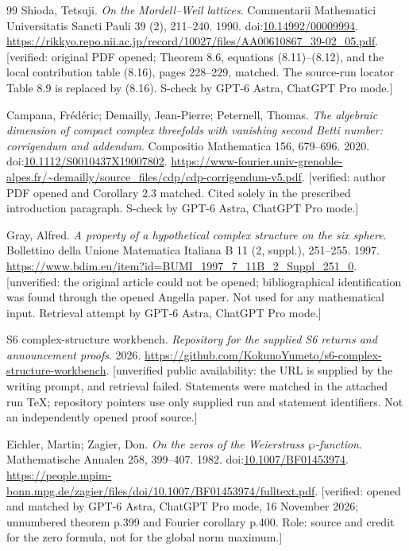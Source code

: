 \begin{thebibliography}{99}
Shioda, Tetsuji. \emph{On the Mordell--Weil lattices}. Commentarii Mathematici Universitatis Sancti Pauli 39 (2), 211--240. 1990. doi:\url{10.14992/00009994}. \url{https://rikkyo.repo.nii.ac.jp/record/10027/files/AA00610867_39-02_05.pdf}. [verified: original PDF opened; Theorem 8.6, equations (8.11)--(8.12), and the local contribution table (8.16), pages 228--229, matched. The source-run locator Table 8.9 is replaced by (8.16). S-check by GPT-6 Astra, ChatGPT Pro mode.]

Campana, Fr{\'e}d{\'e}ric; Demailly, Jean-Pierre; Peternell, Thomas. \emph{The algebraic dimension of compact complex threefolds with vanishing second Betti number: corrigendum and addendum}. Compositio Mathematica 156, 679--696. 2020. doi:\url{10.1112/S0010437X19007802}. \url{https://www-fourier.univ-grenoble-alpes.fr/~demailly/source_files/cdp/cdp-corrigendum-v5.pdf}. [verified: author PDF opened and Corollary 2.3 matched. Cited solely in the prescribed introduction paragraph. S-check by GPT-6 Astra, ChatGPT Pro mode.]

Gray, Alfred. \emph{A property of a hypothetical complex structure on the six sphere}. Bollettino della Unione Matematica Italiana B 11 (2, suppl.), 251--255. 1997. \url{https://www.bdim.eu/item?id=BUMI_1997_7_11B_2_Suppl_251_0}. [unverified: the original article could not be opened; bibliographical identification was found through the opened Angella paper. Not used for any mathematical input. Retrieval attempt by GPT-6 Astra, ChatGPT Pro mode.]

{S6 complex-structure workbench}. \emph{Repository for the supplied S6 returns and announcement proofs}. 2026. \url{https://github.com/KokunoYumeto/s6-complex-structure-workbench}. [unverified public availability: the URL is supplied by the writing prompt, and retrieval failed. Statements were matched in the attached run TeX; repository pointers use only supplied run and statement identifiers. Not an independently opened proof source.]

Eichler, Martin; Zagier, Don. \emph{On the zeros of the {Weierstrass} $\wp$-function}. Mathematische Annalen 258, 399--407. 1982. doi:\url{10.1007/BF01453974}. \url{https://people.mpim-bonn.mpg.de/zagier/files/doi/10.1007/BF01453974/fulltext.pdf}. [verified: opened and matched by GPT-6 Astra, ChatGPT Pro mode, 16 November 2026; unnumbered theorem p.399 and Fourier corollary p.400. Role: source and credit for the zero formula, not for the global norm maximum.]


\end{thebibliography}

